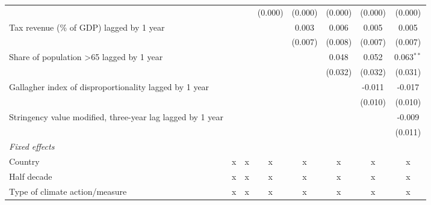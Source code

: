 \begin{tabular}{lccccccc}
                                                                                &              &              & (0.000)      & (0.000)       & (0.000)      & (0.000)      & (0.000)\\   
   Tax revenue (\% of GDP) lagged by 1 year                                     &              &              &              & 0.003         & 0.006        & 0.005        & 0.005\\   
                                                                                &              &              &              & (0.007)       & (0.008)      & (0.007)      & (0.007)\\   
   Share of population >65 lagged by 1 year                                     &              &              &              &               & 0.048        & 0.052        & 0.063$^{**}$\\   
                                                                                &              &              &              &               & (0.032)      & (0.032)      & (0.031)\\   
   Gallagher index of disproportionality lagged by 1 year                       &              &              &              &               &              & -0.011       & -0.017\\   
                                                                                &              &              &              &               &              & (0.010)      & (0.010)\\   
   Stringency value modified, three-year lag lagged by 1 year                   &              &              &              &               &              &              & -0.009\\   
                                                                                &              &              &              &               &              &              & (0.011)\\   
   \emph{Fixed effects}\\
   Country                                                                      & x            & x            & x            & x             & x            & x            & x\\  
   Half decade                                                                  & x            & x            & x            & x             & x            & x            & x\\  
   Type of climate action/measure                                               & x            & x            & x            & x             & x            & x            & x\\  

\end{tabular}

